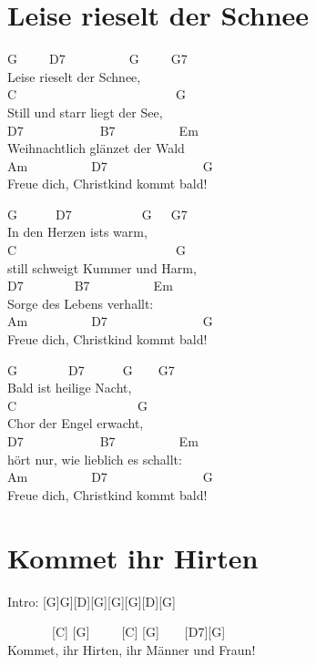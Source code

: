\documentclass[
  letterpaper,
  a5paper]{memoir}
\begin{document}
\hypertarget{leise-rieselt-der-schnee}{%
\chapter{Leise rieselt der Schnee}\label{leise-rieselt-der-schnee}}

G~~~~~D7~~~~~~~~~~G~~~~~G7\\
Leise rieselt der Schnee,\\
C~~~~~~~~~~~~~~~~~~~~~~~~~G\\
Still und starr liegt der See,\\
D7~~~~~~~~~~~~B7~~~~~~~~~~Em\\
Weihnachtlich glänzet der Wald\\
Am~~~~~~~~~~D7~~~~~~~~~~~~~~~G\\
Freue dich, Christkind kommt bald!

G~~~~~~D7~~~~~~~~~~~G~~~G7\\
In den Herzen ist\textquotesingle s warm,\\
C~~~~~~~~~~~~~~~~~~~~~~~~~G\\
still schweigt Kummer und Harm,\\
D7~~~~~~~~B7~~~~~~~~~~Em\\
Sorge des Lebens verhallt:\\
Am~~~~~~~~~~D7~~~~~~~~~~~~~~~G\\
Freue dich, Christkind kommt bald!

G~~~~~~~~D7~~~~~~G~~~~G7\\
Bald ist heilige Nacht,\\
C~~~~~~~~~~~~~~~~~~~G\\
Chor der Engel erwacht,\\
D7~~~~~~~~~~~~B7~~~~~~~~~~Em\\
hört nur, wie lieblich es schallt:\\
Am~~~~~~~~~~D7~~~~~~~~~~~~~~~G\\
Freue dich, Christkind kommt bald!

\hypertarget{kommet-ihr-hirten}{%
\chapter{Kommet ihr Hirten}\label{kommet-ihr-hirten}}

Intro: {[}G{]}G{]}{[}D{]}{[}G{]}{[}G{]}{[}G{]}{[}D{]}{[}G{]}

~~~~~~~{[}C{]} {[}G{]}~~~~~{[}C{]} {[}G{]}~~~~{[}D7{]}{[}G{]}\\
Kommet, ihr Hirten, ihr Männer und Fraun!
\end{document}
